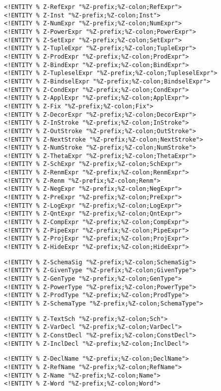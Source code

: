 \documentclass[a4paper,10pt]{article}
\begin{document}
\begin{verbatim}
<!ENTITY % Z-RefExpr "%Z-prefix;%Z-colon;RefExpr">
<!ENTITY % Z-Inst "%Z-prefix;%Z-colon;Inst">
<!ENTITY % Z-NumExpr "%Z-prefix;%Z-colon;NumExpr">
<!ENTITY % Z-PowerExpr "%Z-prefix;%Z-colon;PowerExpr">
<!ENTITY % Z-SetExpr "%Z-prefix;%Z-colon;SetExpr">
<!ENTITY % Z-TupleExpr "%Z-prefix;%Z-colon;TupleExpr">
<!ENTITY % Z-ProdExpr "%Z-prefix;%Z-colon;ProdExpr">
<!ENTITY % Z-BindExpr "%Z-prefix;%Z-colon;BindExpr">
<!ENTITY % Z-TupleselExpr "%Z-prefix;%Z-colon;TupleselExpr">
<!ENTITY % Z-BindselExpr "%Z-prefix;%Z-colon;BindselExpr">
<!ENTITY % Z-CondExpr "%Z-prefix;%Z-colon;CondExpr">
<!ENTITY % Z-ApplExpr "%Z-prefix;%Z-colon;ApplExpr">
<!ENTITY % Z-Fix "%Z-prefix;%Z-colon;Fix">
<!ENTITY % Z-DecorExpr "%Z-prefix;%Z-colon;DecorExpr">
<!ENTITY % Z-InStroke "%Z-prefix;%Z-colon;InStroke">
<!ENTITY % Z-OutStroke "%Z-prefix;%Z-colon;OutStroke">
<!ENTITY % Z-NextStroke "%Z-prefix;%Z-colon;NextStroke">
<!ENTITY % Z-NumStroke "%Z-prefix;%Z-colon;NumStroke">
<!ENTITY % Z-ThetaExpr "%Z-prefix;%Z-colon;ThetaExpr">
<!ENTITY % Z-SchExpr "%Z-prefix;%Z-colon;SchExpr">
<!ENTITY % Z-RenmExpr "%Z-prefix;%Z-colon;RenmExpr">
<!ENTITY % Z-Renm "%Z-prefix;%Z-colon;Renm">
<!ENTITY % Z-NegExpr "%Z-prefix;%Z-colon;NegExpr">
<!ENTITY % Z-PreExpr "%Z-prefix;%Z-colon;PreExpr">
<!ENTITY % Z-LogExpr "%Z-prefix;%Z-colon;LogExpr">
<!ENTITY % Z-QntExpr "%Z-prefix;%Z-colon;QntExpr">
<!ENTITY % Z-CompExpr "%Z-prefix;%Z-colon;CompExpr">
<!ENTITY % Z-PipeExpr "%Z-prefix;%Z-colon;PipeExpr">
<!ENTITY % Z-ProjExpr "%Z-prefix;%Z-colon;ProjExpr">
<!ENTITY % Z-HideExpr "%Z-prefix;%Z-colon;HideExpr">
\end{verbatim}
\begin{verbatim}
<!ENTITY % Z-SchemaSig "%Z-prefix;%Z-colon;SchemaSig">
<!ENTITY % Z-GivenType "%Z-prefix;%Z-colon;GivenType">
<!ENTITY % Z-GenType "%Z-prefix;%Z-colon;GenType">
<!ENTITY % Z-PowerType "%Z-prefix;%Z-colon;PowerType">
<!ENTITY % Z-ProdType "%Z-prefix;%Z-colon;ProdType">
<!ENTITY % Z-SchemaType "%Z-prefix;%Z-colon;SchemaType">
\end{verbatim}
\begin{verbatim}
<!ENTITY % Z-TextSch "%Z-prefix;%Z-colon;Sch">
<!ENTITY % Z-VarDecl "%Z-prefix;%Z-colon;VarDecl">
<!ENTITY % Z-ConstDecl "%Z-prefix;%Z-colon;ConstDecl">
<!ENTITY % Z-InclDecl "%Z-prefix;%Z-colon;InclDecl">
\end{verbatim}
\begin{verbatim}
<!ENTITY % Z-DeclName "%Z-prefix;%Z-colon;DeclName">
<!ENTITY % Z-RefName "%Z-prefix;%Z-colon;RefName">
<!ENTITY % Z-Name "%Z-prefix;%Z-colon;Name">
<!ENTITY % Z-Word "%Z-prefix;%Z-colon;Word">
\end{verbatim}
\end{document}
